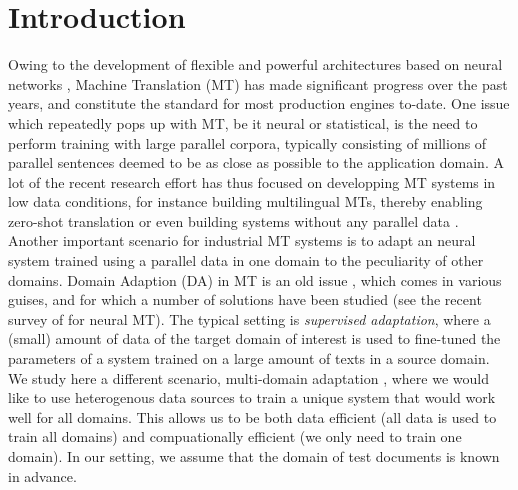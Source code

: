 \documentclass[11pt,a4paper]{article}
\begin{document}
\section{Introduction \label{sec:introduction}}
Owing to the development of flexible and powerful architectures based on neural networks \cite{Cho14properties,bahdanau2014neural,Ghering17convolutional,Vaswani17attention}, Machine Translation (MT) has made significant progress over the past years, and constitute the standard for most production engines to-date. One issue which repeatedly pops up with MT, be it neural or statistical, is the need to perform training with large parallel corpora, typically consisting of millions of parallel sentences deemed to be as close as possible to the application domain. A lot of the recent research effort has thus focused on developping MT systems in low data conditions, for instance building multilingual MTs, thereby enabling zero-shot translation \cite{Firat16multiway,Johnson17google} or even building systems without any parallel data \cite{Artetxe18unsupervised,Lample18unsupervised}.
Another important scenario for industrial MT systems is to adapt an neural system trained using a parallel data in one  domain to the peculiarity of other domains. Domain Adaption (DA) in MT is an old issue \cite{Foster07mixture,Axelrod11domain}, which comes in various guises, and for which a number of solutions have been studied (see the recent survey of \cite{Chu18asurvey} for neural MT). The typical setting is \emph{supervised adaptation}, where a (small) amount of data of the target domain of interest is used to fine-tuned the parameters of a system trained on a large amount of texts in a source domain. We study here a different scenario, multi-domain adaptation \cite{Farajian17multidomain}, where we would like to use heterogenous data sources to train a unique system that would work well for all domains. This allows us to be both data efficient (all data is used to train all domains) and compuationally efficient (we only need to train one domain). In our setting, we assume that the domain of test documents is known in advance.
\end{document}
